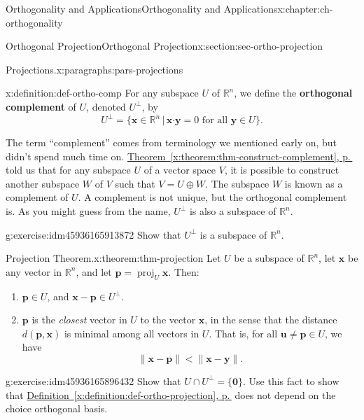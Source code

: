 \documentclass[oneside,10pt,]{book}
\newcommand{\xreffont}{\relax}
\newcommand{\terminology}[1]{\textbf{#1}}
\numberwithin{equation}{section}
\newcommand{\R}{\mathbb{R}}
\newcommand{\dotp}{\!\boldsymbol{\cdot}\!}
\newcommand{\len}[1]{\lVert #1\rVert}
\newcommand{\proj}[2]{\operatorname{proj}_{#1}{#2}}
\newcommand{\uu}{\mathbf{u}}
\newcommand{\xx}{\mathbf{x}}
\newcommand{\yy}{\mathbf{y}}
\newcommand{\lt}{<}
\begin{document}
\begin{chapterptx}{Orthogonality and Applications}{}{Orthogonality and Applications}{}{}{x:chapter:ch-orthogonality}
\begin{sectionptx}{Orthogonal Projection}{}{Orthogonal Projection}{}{}{x:section:sec-ortho-projection}
\begin{paragraphs}{Projections.}{x:paragraphs:pars-projections}
\begin{definition}{}{x:definition:def-ortho-comp}%
For any subspace \(U\) of \(\R^n\), we define the \terminology{orthogonal complement} of \(U\), denoted \(U^\bot\), by%
\begin{equation*}
U^\bot = \{\xx\in\R^n \,|\, \xx\dotp\yy = 0 \text{ for all } \yy\in U\}\text{.}
\end{equation*}
%
\end{definition}
The term ``complement'' comes from terminology we mentioned early on, but didn't spend much time on. \hyperref[x:theorem:thm-construct-complement]{Theorem~{\xreffont\ref{x:theorem:thm-construct-complement}}, p.\,\pageref{x:theorem:thm-construct-complement}} told us that for any subspace \(U\) of a vector space \(V\), it is possible to construct another subspace \(W\) of \(V\) such that \(V = U\oplus W\). The subspace \(W\) is known as a complement of \(U\). A complement is not unique, but the orthogonal complement is. As you might guess from the name, \(U^\bot\) is also a subspace of \(\R^n\).%
\begin{inlineexercise}{}{g:exercise:idm45936165913872}%
Show that \(U^\bot\) is a subspace of \(\R^n\).%
\end{inlineexercise}%
\begin{theorem}{Projection Theorem.}{}{x:theorem:thm-projection}%
Let \(U\) be a subspace of \(\R^n\), let \(\xx\) be any vector in \(\R^n\), and let \(\mathbf{p}=\proj{U}{\xx}\). Then:%
\begin{enumerate}
\item{}\(\mathbf{p}\in U\), and \(\xx-\mathbf{p}\in U^\bot\).%
\item{}\(\mathbf{p}\) is the \emph{closest} vector in \(U\) to the vector \(\xx\), in the sense that the distance \(d(\mathbf{p},\xx)\) is minimal among all vectors in \(U\). That is, for all \(\uu\neq \mathbf{p}\in U\), we have%
\begin{equation*}
\len{\xx-\mathbf{p}}\lt\len{\xx-\yy}\text{.}
\end{equation*}
%
\end{enumerate}
%
\end{theorem}
\begin{inlineexercise}{}{g:exercise:idm45936165896432}%
Show that \(U\cap U^\bot = \{\mathbf{0}\}\). Use this fact to show that \hyperref[x:definition:def-ortho-projection]{Definition~{\xreffont\ref{x:definition:def-ortho-projection}}, p.\,\pageref{x:definition:def-ortho-projection}} does not depend on the choice orthogonal basis.%
\par\smallskip%

\end{inlineexercise}
\end{paragraphs}
\end{sectionptx}
\end{chapterptx}
\end{document}
